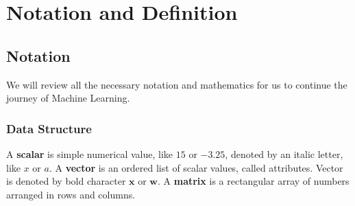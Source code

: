 \chapter{Notation and Definition}

\section{Notation}

We will review all the necessary notation and mathematics for us to continue the journey of Machine Learning.

\subsection{Data Structure}

A \textbf{scalar} is simple numerical value, like $15$ or $-3.25$, denoted by an italic letter, like $x$ or $a$. A \textbf{vector} is an ordered list of scalar values, called attributes. Vector is denoted by bold character $\mathbf{x}$ or $\mathbf{w}$. A \textbf{matrix} is a rectangular array of numbers arranged in rows and columns.

